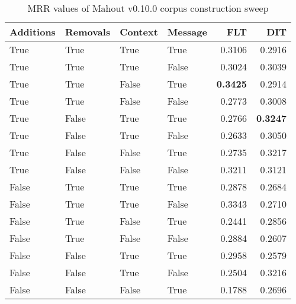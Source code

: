 
\begin{table}
\begin{spacing}{1.2}
\centering
\caption{MRR values of Mahout v0.10.0 corpus construction sweep}
\label{table:mahout_corpus_sweep}
\vspace{0.2em}
\begin{tabular}{llll|rr}
\toprule
Additions & Removals & Context & Message & FLT &       DIT \\
\midrule
     True &     True &    True &    True &           0.3106 &       0.2916 \\
     True &     True &    True &   False &           0.3024 &       0.3039 \\
     True &     True &   False &    True &     {\bf 0.3425} &       0.2914 \\
     True &     True &   False &   False &           0.2773 &       0.3008 \\
     True &    False &    True &    True &           0.2766 & {\bf 0.3247} \\
     True &    False &    True &   False &           0.2633 &       0.3050 \\
     True &    False &   False &    True &           0.2735 &       0.3217 \\
     True &    False &   False &   False &           0.3211 &       0.3121 \\
    False &     True &    True &    True &           0.2878 &       0.2684 \\
    False &     True &    True &   False &           0.3343 &       0.2710 \\
    False &     True &   False &    True &           0.2441 &       0.2856 \\
    False &     True &   False &   False &           0.2884 &       0.2607 \\
    False &    False &    True &    True &           0.2958 &       0.2579 \\
    False &    False &    True &   False &           0.2504 &       0.3216 \\
    False &    False &   False &    True &           0.1788 &       0.2696 \\
\bottomrule
\end{tabular}

\end{spacing}
\end{table}
